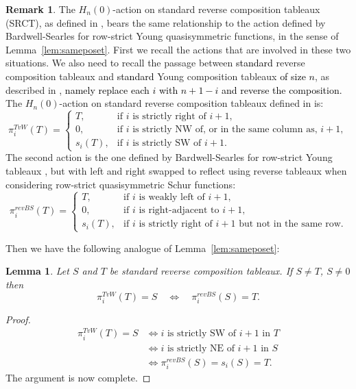 \documentclass[12pt,letterpaper]{amsart}
\newcommand{\svw}{\textcolor{black}}
\newtheorem{lemma}[theorem]{Lemma}
\theoremstyle{definition}
\newtheorem{remark}[theorem]{Remark}
\newcommand{\hn}{H_n(0)}
\begin{document}
\begin{remark}\label{rem:Steph-TvW-BardwellSearles}
The $\hn$-action on standard reverse composition tableaux (SRCT), as defined in \cite{TvW2015}, bears the same relationship  to the action defined by Bardwell-Searles \cite{BS2021} for row-strict Young quasisymmetric functions, in the sense of Lemma~\ref{lem:sameposet}.  First we recall the actions that are involved in these two situations.  We also need to recall the passage between \svw{standard} reverse composition tableaux and \svw{standard} Young composition tableaux \svw{of size $n$}, as described in \cite[Chapter 4, Chapter 5]{LMvW2013}, \svw{namely replace each $i$ with $n+1-i$ and reverse the composition.}
The $\hn$-action on standard reverse composition tableaux defined in \cite{TvW2015} is:
\begin{equation}\label{eqn:defn-TvW(T)}\pi_i^{TvW}(T)=\begin{cases} T, & \text{if $i$ is strictly right of $i+1$},\\
0,  & \text{if $i$ is strictly NW of, or in the same column as, $i+1$},\\
s_i(T), & \text{if $i$ is strictly SW of $i+1$}.
\end{cases}\end{equation}
The second action is the one defined by Bardwell-Searles   for row-strict Young tableaux \cite{BS2021},  
but with left and right swapped to reflect using reverse tableaux when considering row-strict quasisymmetric Schur functions:
\begin{equation}\label{eqn:defn-RBS(T)}\pi_i^{revBS}(T)=\begin{cases} T, & \text{if $i$ is weakly left of $i+1$},\\
0,  & \text{if $i$ is right-adjacent to $i+1$},\\
s_i(T), & \text{if $i$ is strictly right of $i+1$ but not in the same row}.
\end{cases}\end{equation}
\end{remark}
Then we have the following  analogue of 
Lemma~\ref{lem:sameposet}:
\begin{lemma}\label{lem:arrows} Let $S$ and $T$ be standard reverse composition tableaux. If $S\neq T$, $S\neq 0$ then
$$\pi_i^{TvW}(T)=S \quad \iff \quad \pi_i^{revBS}(S)=T.$$
\end{lemma}
\begin{proof}
\begin{align*}
\pi_i^{TvW}(T)=S &\iff \text{$i$ is strictly SW of $i+1$ in $T$}\\
&\iff \text{$i$ is strictly NE of $i+1$ in $S$}\\
&\iff \pi_i^{revBS}(S)= s_i(S)=T.
\end{align*}
The argument is now complete.
\end{proof}
\end{document}
